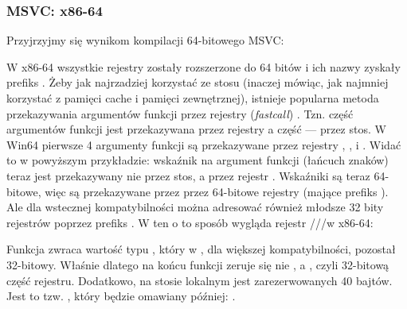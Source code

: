 \subsubsection{MSVC: x86-64}

Przyjrzyjmy się wynikom kompilacji 64-bitowego MSVC:




W x86-64 wszystkie rejestry zostały rozszerzone do 64 bitów i ich nazwy zyskały prefiks .
Żeby jak najrzadziej korzystać ze stosu (inaczej mówiąc, jak najmniej korzystać z pamięci cache i pamięci zewnętrznej), istnieje popularna metoda przekazywania argumentów funkcji przez rejestry (\emph{fastcall}) .
Tzn. część argumentów funkcji jest przekazywana przez rejestry a część --- przez stos.
W Win64 pierwsze 4 argumenty funkcji są przekazywane przez rejestry \RCX, \RDX,  i .
Widać to w powyższym przykładzie: wskaźnik na argument funkcji \printf (łańcuch znaków) teraz jest przekazywany nie przez stos, a przez rejestr \RCX.
Wskaźniki są teraz 64-bitowe, więc są przekazywane przez przez 64-bitowe rejestry (mające prefiks ).
Ale dla wstecznej kompatybilności można adresować również młodsze 32 bity rejestrów poprzez prefiks .
W ten o to sposób wygląda rejestr \RAX/\EAX/\AX/\AL w x86-64:


Funkcja \main zwraca wartość typu \Tint, który w \CCpp, dla większej kompatybilności,
pozostał 32-bitowy. Właśnie dlatego na końcu funkcji \main zeruje się nie \RAX, a \EAX, czyli 32-bitową część rejestru.
Dodatkowo, na stosie lokalnym jest zarezerwowanych 40 bajtów.
Jest to tzw. , który będzie omawiany później: .

